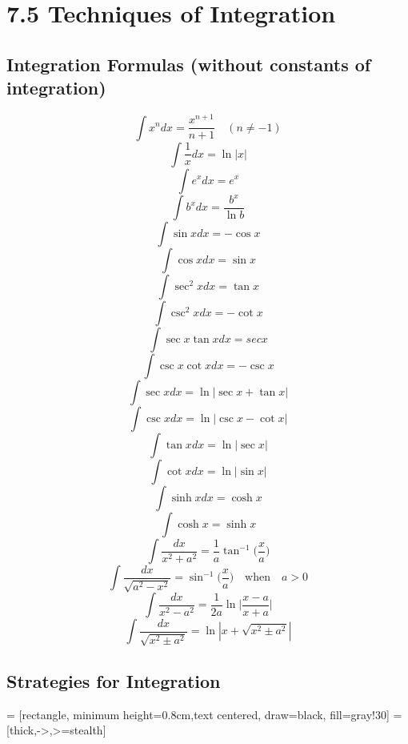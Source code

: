 %
%

\section*{7.5 Techniques of Integration}

\subsection*{Integration Formulas (without constants of integration)}

\[ \int{x^n dx} = \frac{x^{n+1}}{n+1} \quad (n \neq -1) \]
\[ \int{\frac{1}{x}dx} = \ln{|x|} \]
\[ \int{e^xdx} = e^x \]
\[ \int{b^xdx} = \frac{b^x}{\ln{b}} \]
\[ \int{\sin{x}dx} = - \cos{x} \]
\[ \int{\cos{x}dx} = \sin{x} \]
\[ \int{\sec^2{x}dx} = \tan{x} \]
\[ \int{\csc^2{x}dx = - \cot{x}} \]
\[ \int{\sec{x}\tan{x}dx} = sec{x} \]
\[ \int{\csc{x}\cot{x}dx} = - \csc{x} \]
\[ \int{\sec{x}dx} = \ln{| \sec{x} + \tan{x} |} \]
\[ \int{\csc{x}dx} = \ln{|\csc{x} - \cot{x}|} \]
\[ \int{\tan{x}dx} = \ln{|\sec{x}|} \]
\[ \int{\cot{x}dx} = \ln{|\sin{x}|} \]
\[ \int{\sinh{x}dx} = \cosh{x} \]
\[ \int{\cosh{x}} = \sinh{x} \]
\[ \int{\frac{dx}{x^2 + a^2}} = \frac{1}{a} \tan^{-1} \Big( \frac{x}{a} \Big) \]
\[ \int{\frac{dx}{\sqrt{a^2 - x^2}}} = \sin^{-1} \Big( \frac{x}{a} \Big) \quad \text{when} \quad a > 0 \]
\[ \int{\frac{dx}{x^2 - a^2}} = \frac{1}{2a} \ln{ \Big| \frac{x-a}{x+a} \Big| } \]
\[ \int{\frac{dx}{\sqrt{x^2 \pm a^2}}} = \ln{| x + \sqrt{x^2 \pm a^2} |} \]

\subsection*{Strategies for Integration}

 = [rectangle, minimum height=0.8cm,text centered, draw=black, fill=gray!30]
 = [thick,->,>=stealth]

\begin{center}
\end{center}
